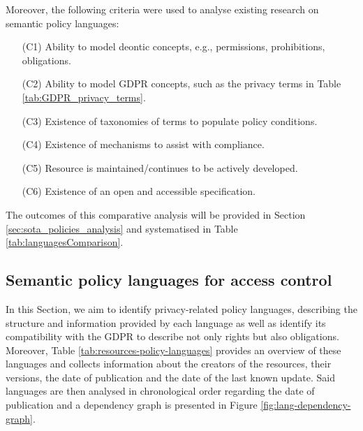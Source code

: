 Moreover, the following criteria were used to analyse existing research on semantic policy languages:
\begin{enumerate}
    \item[(C1)] Ability to model deontic concepts, e.g., permissions, prohibitions, obligations.
    \item[(C2)] Ability to model GDPR concepts, such as the privacy terms in Table \ref{tab:GDPR_privacy_terms}.
    \item[(C3)] Existence of taxonomies of terms to populate policy conditions.
    \item[(C4)] Existence of mechanisms to assist with compliance.
    \item[(C5)] Resource is maintained/continues to be actively developed.
    \item[(C6)] Existence of an open and accessible specification.
\end{enumerate}

The outcomes of this comparative analysis will be provided in Section \ref{sec:sota_policies_analysis} and systematised in Table \ref{tab:languagesComparison}.

\subsection{Semantic policy languages for access control}
\label{sec:sota_policies_description}

In this Section, we aim to identify privacy-related policy languages, describing the structure and information provided by each language as well as identify its compatibility with the GDPR to describe not only rights but also obligations. %
Moreover, Table \ref{tab:resources-policy-languages} provides an overview of these languages and collects information about the creators of the resources, their versions, the date of publication and the date of the last known update.
Said languages are then analysed in chronological order regarding the date of publication and a dependency graph is presented in Figure \ref{fig:lang-dependency-graph}.


